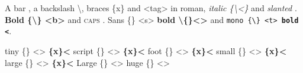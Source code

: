 \documentclass{article}
\begin{document}
A bar \textbar, a backslash \textbackslash, braces \{x\} and \textless tag\textgreater{} in roman, \textit{italic \{\textbackslash\textless\}} and \textsl{slanted \textbar}.
\textbf{Bold \{\textbar\textbackslash\} \textless b\textgreater} and \textsc{caps \textbar}.
\textsf{Sans \{\textbar\} \textless s\textgreater{} \textbf{bold \textbackslash\{\}\textless\textgreater}} and \texttt{mono \{\textbackslash\} \textless t\textgreater{} \textbf{bold \textbar\textless}}.

{\tiny tiny \{\textbar\} \textless\textgreater{} \bfseries \{x\}\textless} {\scriptsize script \{\textbar\} \textless\textgreater{} \bfseries \{x\}\textless}
{\footnotesize foot \{\textbar\} \textless\textgreater{} \bfseries \{x\}\textless} {\small small \{\textbar\} \textless\textgreater{} \bfseries \{x\}\textless}
{\large large \{\textbar\} \textless\textgreater{} \bfseries \{x\}\textless} {\Large Large \{\textbar\} \textless\textgreater}
{\huge huge \{\textbar\} \textless\textgreater}
\end{document}

